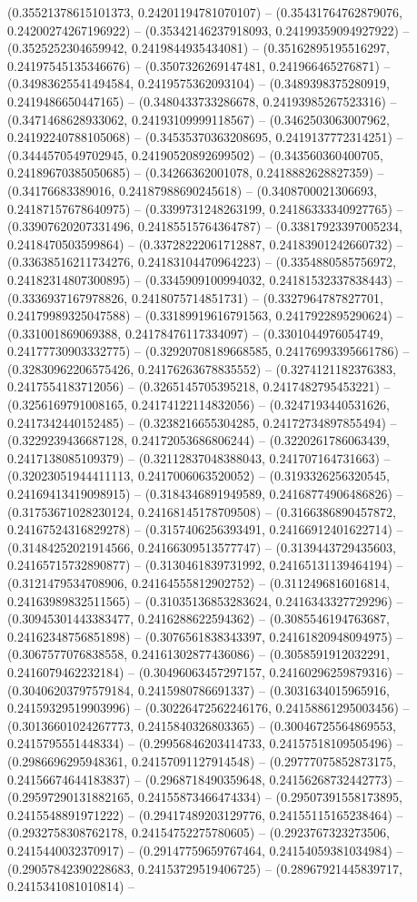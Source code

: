 (0.35521378615101373, 0.24201194781070107) -- (0.35431764762879076, 0.24200274267196922) -- (0.35342146237918093, 0.24199359094927922) -- (0.3525252304659942, 0.2419844935434081) -- (0.35162895195516297, 0.24197545135346676) -- (0.3507326269147481, 0.241966465276871) -- (0.34983625541494584, 0.2419575362093104) -- (0.3489398375280919, 0.2419486650447165) -- (0.3480433733286678, 0.24193985267523316) -- (0.3471468628933062, 0.24193109999118567) -- (0.3462503063007962, 0.24192240788105068) -- (0.34535370363208695, 0.2419137772314251) -- (0.3444570549702945, 0.24190520892699502) -- (0.343560360400705, 0.24189670385050685) -- (0.34266362001078, 0.2418882628827359) -- (0.34176683389016, 0.24187988690245618) -- (0.3408700021306693, 0.24187157678640975) -- (0.3399731248263199, 0.24186333340927765) -- (0.33907620207331496, 0.24185515764364787) -- (0.33817923397005234, 0.2418470503599864) -- (0.33728222061712887, 0.24183901242660732) -- (0.33638516211734276, 0.24183104470964223) -- (0.3354880585756972, 0.24182314807300895) -- (0.3345909100994032, 0.24181532337838443) -- (0.3336937167978826, 0.2418075714851731) -- (0.3327964787827701, 0.24179989325047588) -- (0.33189919616791563, 0.2417922895290624) -- (0.331001869069388, 0.24178476117334097) -- (0.3301044976054749, 0.24177730903332775) -- (0.32920708189668585, 0.24176993395661786) -- (0.32830962206575426, 0.24176263678835552) -- (0.3274121182376383, 0.2417554183712056) -- (0.3265145705395218, 0.2417482795453221) -- (0.3256169791008165, 0.24174122114832056) -- (0.3247193440531626, 0.2417342440152485) -- (0.3238216655304285, 0.24172734897855494) -- (0.3229239436687128, 0.24172053686806244) -- (0.3220261786063439, 0.2417138085109379) -- (0.32112837048388043, 0.241707164731663) -- (0.32023051944411113, 0.2417006063520052) -- (0.3193326256320545, 0.24169413419098915) -- (0.3184346891949589, 0.24168774906486826) -- (0.31753671028230124, 0.24168145178709508) -- (0.3166386890457872, 0.24167524316829278) -- (0.3157406256393491, 0.24166912401622714) -- (0.31484252021914566, 0.24166309513577747) -- (0.3139443729435603, 0.24165715732890877) -- (0.3130461839731992, 0.24165131139464194) -- (0.3121479534708906, 0.24164555812902752) -- (0.3112496816016814, 0.24163989832511565) -- (0.31035136853283624, 0.2416343327729296) -- (0.30945301443383477, 0.2416288622594362) -- (0.3085546194763687, 0.24162348756851898) -- (0.3076561838343397, 0.24161820948094975) -- (0.3067577076838558, 0.24161302877436086) -- (0.3058591912032291, 0.2416079462232184) -- (0.30496063457297157, 0.24160296259879316) -- (0.30406203797579184, 0.2415980786691337) -- (0.3031634015965916, 0.24159329519903996) -- (0.30226472562246176, 0.24158861295003456) -- (0.30136601024267773, 0.2415840326803365) -- (0.30046725564869553, 0.2415795551448334) -- (0.29956846203414733, 0.24157518109505496) -- (0.2986696295948361, 0.24157091127914548) -- (0.29777075852873175, 0.24156674644183837) -- (0.2968718490359648, 0.24156268732442773) -- (0.29597290131882165, 0.24155873466474334) -- (0.29507391558173895, 0.2415548891971222) -- (0.29417489203129776, 0.24155115165238464) -- (0.2932758308762178, 0.24154752275780605) -- (0.2923767323273506, 0.2415440032370917) -- (0.29147759659767464, 0.24154059381034984) -- (0.29057842390228683, 0.24153729519406725) -- (0.28967921445839717, 0.2415341081010814) -- 